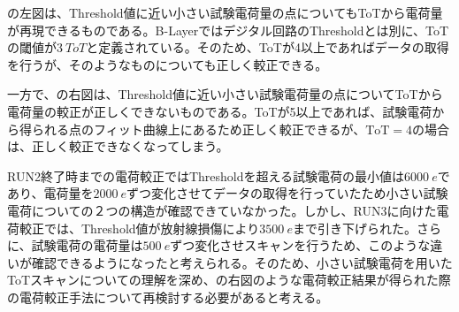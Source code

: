 の左図は、Threshold値に近い小さい試験電荷量の点についてもToTから電荷量が再現できるものである。B-Layerではデジタル回路のThresholdとは別に、ToTの閾値が$3\ \si{ToT}$と定義されている。そのため、ToTが4以上であればデータの取得を行うが、そのようなものについても正しく較正できる。

一方で、の右図は、Threshold値に近い小さい試験電荷量の点についてToTから電荷量の較正が正しくできないものである。ToTが5以上であれば、試験電荷から得られる点のフィット曲線上にあるため正しく較正できるが、$\mathrm{ToT}=4$の場合は、正しく較正できなくなってしまう。

RUN2終了時までの電荷較正ではThresholdを超える試験電荷の最小値は$6000\ \si{e}$であり、電荷量を$2000\ \si{e}$ずつ変化させてデータの取得を行っていたため小さい試験電荷についての２つの構造が確認できていなかった。しかし、RUN3に向けた電荷較正では、Threshold値が放射線損傷により$3500\ \si{e}$まで引き下げられた。さらに、試験電荷の電荷量は$500\ \si{e}$ずつ変化させスキャンを行うため、このような違いが確認できるようになったと考えられる。そのため、小さい試験電荷を用いたToTスキャンについての理解を深め、の右図のような電荷較正結果が得られた際の電荷較正手法について再検討する必要があると考える。


\newpage
